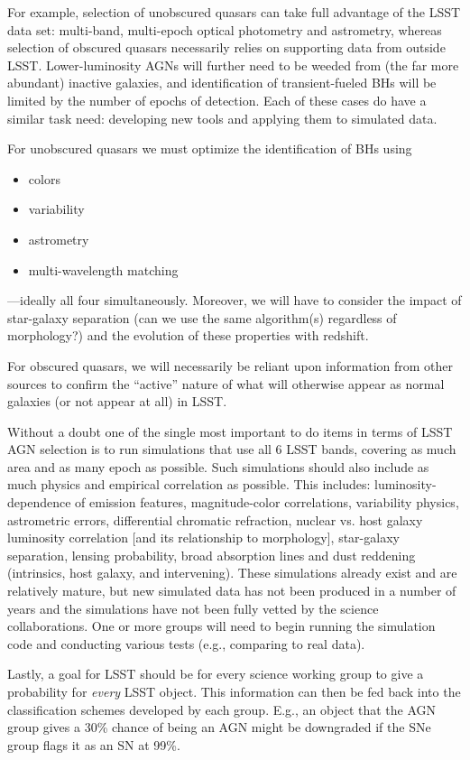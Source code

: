 For example, selection of unobscured quasars can take full advantage
of the LSST data set: multi-band, multi-epoch optical photometry and
astrometry, whereas selection of obscured quasars necessarily relies
on supporting data from outside LSST.  Lower-luminosity AGNs will
further need to be weeded from (the far more abundant) inactive
galaxies, and identification of transient-fueled BHs will be limited
by the number of epochs of detection.  Each of these cases do have a
similar task need: developing new tools and applying them to simulated
data.

For unobscured quasars we must optimize the identification of BHs using
\begin{itemize}
\item colors
\item variability
\item astrometry
\item multi-wavelength matching
\end{itemize}
---ideally all four simultaneously.  Moreover, we will have to
consider the impact of star-galaxy separation (can we use the same
algorithm(s) regardless of morphology?) and the evolution of these
properties with redshift.

For obscured quasars, we will necessarily be reliant upon information
from other sources to confirm the ``active'' nature of what will
otherwise appear as normal galaxies (or not appear at all) in LSST.

Without a doubt one of the single most important to do items in terms of LSST AGN selection is to run simulations that use all 6 LSST bands, covering as much area and as many epoch as possible.  Such simulations should also include as much physics and empirical correlation as possible.  This includes: luminosity-dependence of emission features, magnitude-color correlations, variability physics, astrometric errors, differential chromatic refraction, nuclear vs. host galaxy luminosity correlation [and its relationship to morphology], star-galaxy separation, lensing probability, broad absorption lines and dust reddening (intrinsics, host galaxy, and intervening).  These simulations already exist and are relatively mature, but new simulated data has not been produced in a number of years and the simulations have not been fully vetted by the science collaborations.  One or more groups will need to begin running the simulation code and conducting various tests (e.g., comparing to real data).

Lastly, a goal for LSST should be for every science working group to give a probability for {\em every} LSST object.  This information can then be fed back into the classification schemes developed by each group.  E.g., an object that the AGN group gives a 30\% chance of being an AGN might be downgraded if the SNe group flags it as an SN at 99\%.

